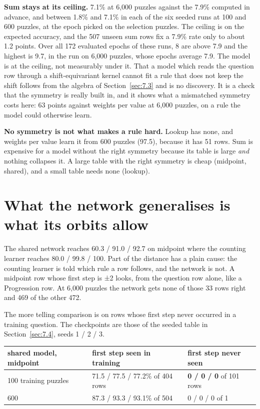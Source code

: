 \textbf{Sum stays at its ceiling.} 7.1\% at 6,000 puzzles against the 7.9\% computed in advance, and between 1.8\% and 7.1\% in each of the six seeded runs at 100 and 600 puzzles, at the epoch picked on the selection puzzles. The ceiling is on the expected accuracy, and the 507 unseen sum rows fix a 7.9\% rate only to about 1.2 points. Over all 172 evaluated epochs of these runs, 8 are above 7.9 and the highest is 9.7, in the run on 6,000 puzzles, whose epochs average 7.9. The model is at the ceiling, not measurably under it. That a model which reads the question row through a shift-equivariant kernel cannot fit a rule that does not keep the shift follows from the algebra of Section~\ref{sec:7.3} and is no discovery. It is a check that the symmetry is really built in, and it shows what a mismatched symmetry costs here: 63 points against weights per value at 6,000 puzzles, on a rule the model could otherwise learn.

\textbf{No symmetry is not what makes a rule hard.} Lookup has none, and weights per value learn it from 600 puzzles (97.5), because it has 51 rows. Sum is expensive for a model without the right symmetry because its table is large \emph{and} nothing collapses it. A large table with the right symmetry is cheap (midpoint, shared), and a small table needs none (lookup).

\section{What the network generalises is what its orbits allow}\label{sec:7.5}

The shared network reaches 60.3 / 91.0 / 92.7 on midpoint where the counting learner reaches 80.0 / 99.8 / 100. Part of the distance has a plain cause: the counting learner is told which rule a row follows, and the network is not. A midpoint row whose first step is ±2 looks, from the question row alone, like a Progression row. At 6,000 puzzles the network gets none of those 33 rows right and 469 of the other 472.

The more telling comparison is on rows whose first step never occurred in a training question. The checkpoints are those of the seeded table in Section~\ref{sec:7.4}, seeds 1 / 2 / 3.

\begin{center}\small
\begin{tabular}{@{}lll@{}}
\toprule
shared model, midpoint & first step seen in training & first step never seen \\
\midrule
100 training puzzles & 71.5 / 77.5 / 77.2\% of 404 rows & \textbf{0 / 0 / 0} of 101 rows \\
600 & 87.3 / 93.3 / 93.1\% of 504 & 0 / 0 / 0 of 1 \\
\bottomrule
\end{tabular}
\end{center}

